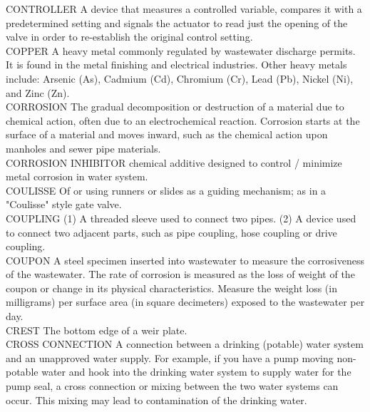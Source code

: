 CONTROLLER
A device that measures a controlled variable, compares it with a predetermined setting and signals the actuator to read just the opening of the valve in order to re-establish the original control setting.
\vspace{0.3cm}\\
COPPER
A heavy metal commonly regulated by wastewater discharge permits. It is found in the metal finishing and electrical industries. Other heavy metals include: Arsenic (As), Cadmium (Cd), Chromium (Cr), Lead (Pb), Nickel (Ni), and Zinc (Zn).
\vspace{0.3cm}\\
CORROSION
The gradual decomposition or destruction of a material due to chemical action, often due to an electrochemical reaction. Corrosion starts at the surface of a material and moves inward, such as the chemical action upon manholes and sewer pipe materials. 
\vspace{0.3cm}\\
CORROSION INHIBITOR
chemical additive designed to control / minimize metal corrosion in water system.
\vspace{0.3cm}\\
COULISSE
Of or using runners or slides as a guiding mechanism; as in a "Coulisse" style gate valve.
\vspace{0.3cm}\\
COUPLING
(1) A threaded sleeve used to connect two pipes. (2) A device used to connect two adjacent parts, such as pipe coupling, hose coupling or drive coupling. 
\vspace{0.3cm}\\
COUPON
A steel specimen inserted into wastewater to measure the corrosiveness of the wastewater. The rate of corrosion is measured as the loss of weight of the coupon or change in its physical characteristics. Measure the weight loss (in milligrams) per surface area (in square decimeters) exposed to the wastewater per day. 
\vspace{0.3cm}\\
CREST
The bottom edge of a weir plate.
\vspace{0.3cm}\\
CROSS CONNECTION
A connection between a drinking (potable) water system and an unapproved water supply. For example, if you have a pump moving non-potable water and hook into the drinking water system to supply water for the pump seal, a cross connection or mixing between the two water systems can occur. This mixing may lead to contamination of the drinking water.
\vspace{0.3cm}\\
